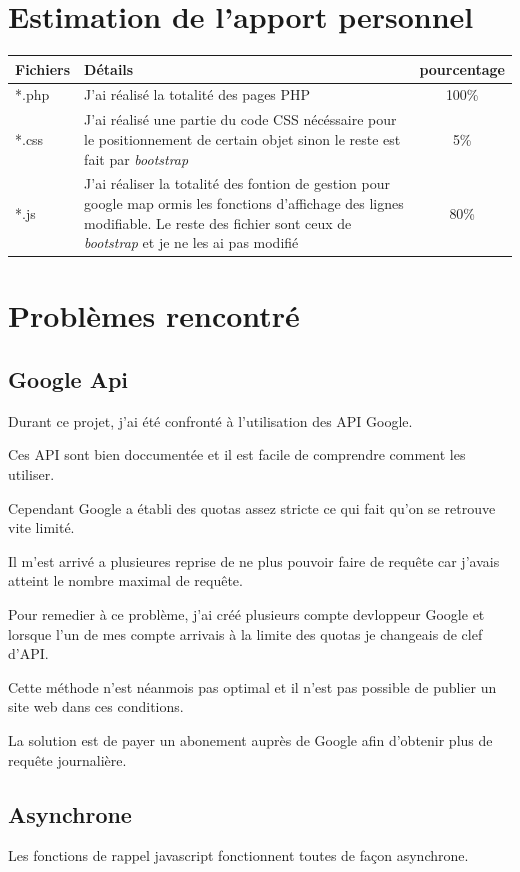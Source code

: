 \documentclass[a4paper]{article}
\begin{document}
\section{Estimation de l'apport personnel}
\begin{tabular}{|l|p{11cm}|c|}
	\hline
	Fichiers & Détails & pourcentage \\ \hline \hline
	*.php & J'ai réalisé la totalité des pages PHP & 100\% \\ \hline
	*.css & J'ai réalisé une partie du code CSS nécéssaire pour le positionnement de certain objet sinon le reste est fait par \emph{bootstrap} & 5\% \\ \hline
	*.js &J'ai réaliser la totalité des fontion de gestion pour google map ormis les fonctions d'affichage des lignes modifiable. Le reste des fichier sont ceux de \emph{bootstrap} et je ne les ai pas modifié &80\% \\ \hline
\end{tabular}

\newpage
\section{Problèmes rencontré}
\subsection{Google Api}
Durant ce projet, j'ai été confronté à l'utilisation des API Google. 

Ces API sont bien doccumentée et il est facile de comprendre comment les utiliser.

Cependant Google a établi des quotas assez stricte ce qui fait qu'on se retrouve vite limité.

Il m'est arrivé a plusieures reprise de ne plus pouvoir faire de requête car j'avais atteint le nombre maximal de requête. 

Pour remedier à ce problème, j'ai créé plusieurs compte devloppeur Google et lorsque l'un de mes compte arrivais à la limite des quotas je changeais de clef d'API.

Cette méthode n'est néanmois pas optimal et il n'est pas possible de publier un site web dans ces conditions.

La solution est de payer un abonement auprès de Google afin d'obtenir plus de requête journalière.
\subsection{Asynchrone}
Les fonctions de rappel javascript fonctionnent toutes de façon asynchrone.
\end{document}
